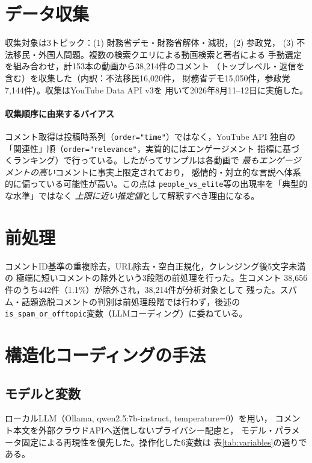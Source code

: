 \documentclass[dvipdfmx, a4paper, 11pt]{jsarticle}
\begin{document}
\section{データ収集}
収集対象は3トピック：(1) 財務省デモ・財務省解体・減税，(2) 参政党，
(3) 不法移民・外国人問題。複数の検索クエリによる動画検索と著者による
手動選定を組み合わせ，計153本の動画から38{,}214件のコメント
（トップレベル・返信を含む）を収集した（内訳：不法移民16{,}020件，
財務省デモ15{,}050件，参政党7{,}144件）。収集はYouTube Data API v3を
用いて2026年8月11--12日に実施した。

\paragraph{収集順序に由来するバイアス}
コメント取得は投稿時系列（\texttt{order="time"}）ではなく，YouTube API
独自の「関連性」順（\texttt{order="relevance"}，実質的にはエンゲージメント
指標に基づくランキング）で行っている。したがってサンプルは各動画で
\emph{最もエンゲージメントの高い}コメントに事実上限定されており，
感情的・対立的な言説へ体系的に偏っている可能性が高い。この点は
\texttt{people\_vs\_elite}等の出現率を「典型的な水準」ではなく
\emph{上限に近い推定値}として解釈すべき理由になる。

\section{前処理}
コメントID基準の重複除去，URL除去・空白正規化，クレンジング後5文字未満の
極端に短いコメントの除外という3段階の前処理を行った。生コメント
38{,}656件のうち442件（1.1\%）が除外され，38{,}214件が分析対象として
残った。スパム・話題逸脱コメントの判別は前処理段階では行わず，後述の
\texttt{is\_spam\_or\_offtopic}変数（LLMコーディング）に委ねている。

\section{構造化コーディングの手法}

\subsection{モデルと変数}
ローカルLLM（Ollama, qwen2.5:7b-instruct, temperature=0）を用い，
コメント本文を外部クラウドAPIへ送信しないプライバシー配慮と，
モデル・パラメータ固定による再現性を優先した。操作化した6変数は
表\ref{tab:variables}の通りである。
\end{document}
